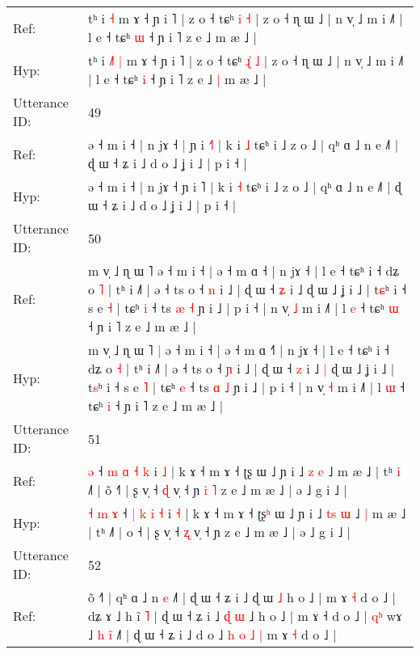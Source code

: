 \documentclass[10pt]{article}
\DeclareRobustCommand{\hl}[1]{{\textcolor{red}{#1}}}
\begin{document}
\begin{longtable}{ll}
Ref: & tʰ i\hl{}\hl{}\hl{} \hl{˧} m ɤ ˧ ɲ i ˥ | z o ˧ tɕʰ \hl{}\hl{i} \hl{˧} | z o ˧ ɳ ɯ ˩ | n v̩ ˩ m i ˩˥ | l e ˧ tɕʰ \hl{ɯ} ˧ ɲ i ˥ z e ˩\hl{}\hl{} m æ ˩ |
 \\
Hyp: & tʰ i\hl{ }\hl{˩}\hl{˥} \hl{|} m ɤ ˧ ɲ i ˥ | z o ˧ tɕʰ \hl{ɻ}\hl{̍} \hl{˩} | z o ˧ ɳ ɯ ˩ | n v̩ ˩ m i ˩˥ | l e ˧ tɕʰ \hl{i} ˧ ɲ i ˥ z e ˩\hl{ }\hl{|} m æ ˩ |
 \\
\midrule
Utterance ID: & 49 \\
Ref: & ə ˧ m i ˧ | n jɤ ˧\hl{ }\hl{|} ɲ i \hl{˧}˥ | k i \hl{˩} tɕʰ i ˩ z o ˩ | qʰ ɑ ˩ n e ˩˥ | ɖ ɯ ˧ ʑ i ˩ d o ˩ ʝ i ˩ | p i ˧ |
 \\
Hyp: & ə ˧ m i ˧ | n jɤ ˧\hl{}\hl{} ɲ i \hl{}˥ | k i \hl{˧} tɕʰ i ˩ z o ˩ | qʰ ɑ ˩ n e ˩˥ | ɖ ɯ ˧ ʑ i ˩ d o ˩ ʝ i ˩ | p i ˧ |
 \\
\midrule
Utterance ID: & 50 \\
Ref: & m v̩ ˩ ɳ ɯ ˥\hl{}\hl{} ə ˧ m i ˧ | ə ˧ m ɑ ˧\hl{} | n jɤ ˧ | l e ˧ tɕʰ i ˧ dʑ o \hl{˥} | tʰ i ˩˥ | ə ˧ ts o ˧ \hl{n} i ˩ | ɖ ɯ ˧ \hl{ʑ} i ˩\hl{}\hl{} ɖ ɯ ˩ ʝ i ˩ | t\hl{ɕ}ʰ i ˧ s e \hl{˧} | tɕʰ \hl{i} ˧ ts \hl{æ} \hl{˧} ɲ i ˩ | p i ˧ | n v̩ \hl{˩} m i ˩˥ | l \hl{e} ˧ tɕʰ \hl{ɯ} ˧ ɲ i ˥ z e ˩ m æ ˩ |
 \\
Hyp: & m v̩ ˩ ɳ ɯ ˥\hl{ }\hl{|} ə ˧ m i ˧ | ə ˧ m ɑ ˧\hl{˥} | n jɤ ˧ | l e ˧ tɕʰ i ˧ dʑ o \hl{˧} | tʰ i ˩˥ | ə ˧ ts o ˧ \hl{ɲ} i ˩ | ɖ ɯ ˧ \hl{z} i ˩\hl{ }\hl{|} ɖ ɯ ˩ ʝ i ˩ | t\hl{s}ʰ i ˧ s e \hl{˥} | tɕʰ \hl{e} ˧ ts \hl{ɑ} \hl{˩} ɲ i ˩ | p i ˧ | n v̩ \hl{˧} m i ˩˥ | l \hl{ɯ} ˧ tɕʰ \hl{i} ˧ ɲ i ˥ z e ˩ m æ ˩ |
 \\
\midrule
Utterance ID: & 51 \\
Ref: & \hl{}\hl{}\hl{}\hl{}\hl{ə} ˧ \hl{m} \hl{ɑ} \hl{˧} \hl{k} i \hl{˩} | k ɤ ˧ m ɤ ˧ ʈʂ\hl{} ɯ ˩ ɲ i ˩ \hl{}\hl{z} \hl{e} ˩\hl{}\hl{} m æ ˩ | tʰ\hl{ }\hl{i} ˩˥ | o\hl{̃} ˧\hl{˥} | ʂ v̩ ˧ \hl{ɖ} v̩ ˧ ɲ\hl{ }\hl{i}\hl{ }\hl{˥} z e ˩ m æ ˩ | ə ˩ g i ˩ |
 \\
Hyp: & \hl{˧}\hl{ }\hl{m}\hl{ }\hl{ɤ} ˧ \hl{|} \hl{k} \hl{i} \hl{˧} i \hl{˧} | k ɤ ˧ m ɤ ˧ ʈʂ\hl{ʰ} ɯ ˩ ɲ i ˩ \hl{t}\hl{s} \hl{ɯ} ˩\hl{ }\hl{|} m æ ˩ | tʰ\hl{}\hl{} ˩˥ | o\hl{} ˧\hl{} | ʂ v̩ ˧ \hl{ʐ} v̩ ˧ ɲ\hl{}\hl{}\hl{}\hl{} z e ˩ m æ ˩ | ə ˩ g i ˩ |
 \\
\midrule
Utterance ID: & 52 \\
Ref: & õ ˧˥ | qʰ ɑ ˩ n \hl{e} ˩˥ | ɖ ɯ ˧ ʑ i ˩ ɖ ɯ \hl{˩} h o ˩ | m ɤ \hl{˧} d o ˩ | dʑ ɤ ˩ h ĩ \hl{˥} | ɖ ɯ ˧ ʑ i ˩ \hl{ɖ} \hl{ɯ} ˩ h o ˩ | m ɤ ˧ d o ˩ |\hl{ }\hl{q}\hl{ʰ} wɤ ˩\hl{ }\hl{h} \hl{i}\hl{̃} ˩˥ | ɖ ɯ ˧ ʑ i ˩\hl{}\hl{} d o ˩ \hl{h} \hl{o} \hl{}\hl{˩} \hl{|} m ɤ \hl{˧} d o ˩ |

\end{longtable}
\end{document}
